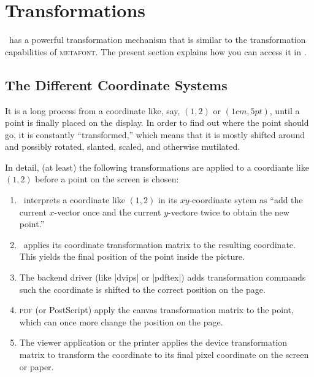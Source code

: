 %


\section{Transformations}

\pgfname\ has a powerful transformation mechanism that is similar to
the transformation capabilities of \textsc{metafont}. The present
section explains how you can access it in \tikzname.


\subsection{The Different Coordinate Systems}

It is a long process from  a coordinate like, say, $(1,2)$ or
$(1cm,5pt)$, until a point is finally placed on the display. In order
to find out where the point should go, it is constantly
``transformed,'' which means that it is mostly shifted around and
possibly rotated, slanted, scaled, and otherwise mutilated.

In detail, (at least) the following transformations are applied to a
coordiante like $(1,2)$ before a point on the screen is chosen:
\begin{enumerate}
\item
  \pgfname\ interprets a coordinate like $(1,2)$  in its
  $xy$-coordinate sytem as ``add the current $x$-vector once and the
  current $y$-vectore twice to obtain the new point.''
\item
  \pgfname\ applies its coordinate transformation matrix to the
  resulting coordinate. This yields the final position of the point 
  inside the picture.
\item
  The backend driver (like |dvips| or |pdftex|) adds transformation
  commands such the coordinate is shifted to the correct position on the
  page.
\item
  \textsc{pdf} (or PostScript) apply the canvas transformation
  matrix to the point, which can once more change the position on the
  page. 
\item
  The viewer application or the printer applies the device
  transformation matrix to transform the coordinate to its final pixel
  coordinate on the screen or paper.  
\end{enumerate}


